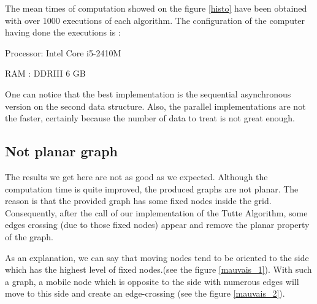 The mean times of computation showed on the figure \ref{histo} have been
obtained with over 1000 executions of each algorithm. The configuration of the
computer having done the executions is :
\begin{description}
\item {Processor}: Intel Core i5-2410M
\item {RAM} : DDRIII 6 GB
\end{description}

One can notice that the best implementation is the sequential asynchronous
version on the second data structure. Also, the parallel implementations
are not the faster, certainly because the number of data to treat is not
great enough.

\subsection{Not planar graph}
The results we get here are not as good as we expected. Although the
computation time is quite improved, the produced graphs are not planar. The
reason is that the provided graph has some fixed nodes inside the
grid. Consequently, after the call of our implementation of the Tutte
Algorithm, some edges crossing (due to those fixed nodes) appear and remove
the planar property of the graph.

As an explanation, we can say that moving nodes tend to be oriented to the 
side which has the highest level of fixed nodes.(see the figure \ref{mauvais_1}). 
With such a graph, a mobile node which is opposite to the side with numerous
edges will move to this side and create an edge-crossing (see the figure \ref{mauvais_2}).

